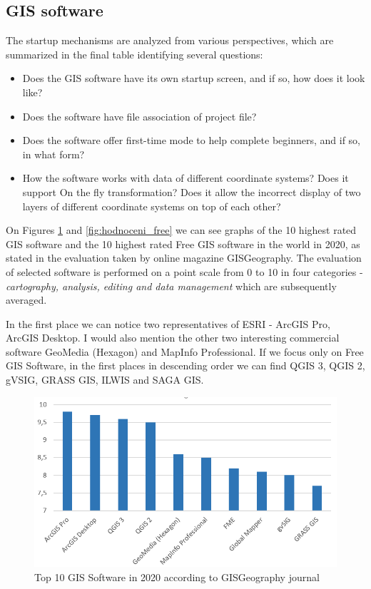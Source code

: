 \documentclass[a4paper,10pt,twoside]{article}
\begin{document}
\subsection{GIS software}
\label{subsection:GIS software}

The startup mechanisms are analyzed from various perspectives, which are summarized in the final table identifying several questions:
\begin{itemize}
\item Does the GIS software have its own startup screen, and if so, how does it look like? 
\item Does the software have file association of project file?
\item Does the software offer first-time mode to help complete beginners, and if so, in what form?
\item How the software works with data of different coordinate systems? Does it support On the fly transformation? Does it allow the incorrect display of two layers of different coordinate systems on top of each other?
\end{itemize}

\noindent On Figures \ref{fig:hodnoceni_all} and  \ref{fig:hodnoceni_free} we can see graphs of the 10 highest rated GIS software and the 10 highest rated Free GIS software in the world in 2020, as stated in the evaluation taken by online magazine GISGeography. The evaluation of selected software is performed on a point scale from 0 to 10 in four categories - \textit{cartography, analysis, editing and data management} which are subsequently averaged. 

In the first place we can notice two representatives of ESRI - ArcGIS Pro, ArcGIS Desktop. I would also mention the other two interesting commercial software GeoMedia (Hexagon) and MapInfo Professional. If we focus only on Free GIS Software, in the first places in descending order we can find QGIS 3, QGIS 2, gVSIG, GRASS GIS, ILWIS and SAGA GIS. 

\vspace{0.3cm}
\begin{figure}[hbt!] 
\begin{center}
\includegraphics[width=13cm]{../pictures/hodnoceni_all.png} 
\caption[Top 10 GIS Software in 2020 according to GISGeography journal]{Top 10 GIS Software in 2020 according to GISGeography journal}
\label{fig:hodnoceni_all}
\end{center}
\end{figure}
\end{document}
